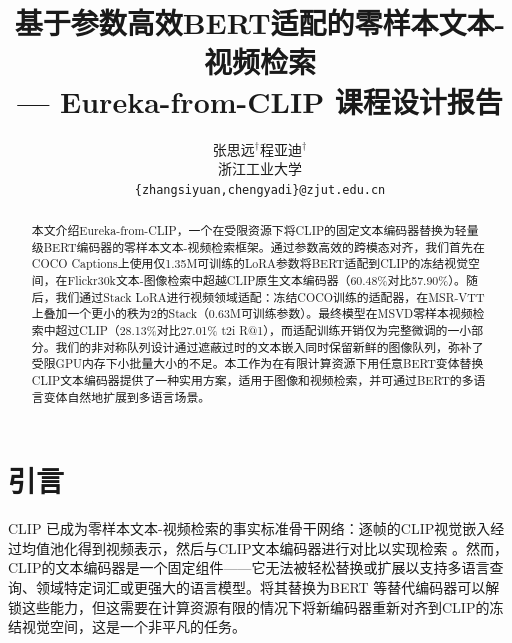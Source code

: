 \documentclass[10pt,a4paper]{ctexart}
\begin{document}
\title{基于参数高效BERT适配的零样本文本-视频检索 \\
\large --- Eureka-from-CLIP 课程设计报告}

\author{张思远$^{\dagger}$\quad 程亚迪$^{\dagger}$\\[4pt]
  \small 浙江工业大学\\
  \small\texttt{\{zhangsiyuan,chengyadi\}@zjut.edu.cn}}

\maketitle

\let\thefootnote\relax
{}

\begin{abstract}
本文介绍Eureka-from-CLIP，一个在受限资源下将CLIP的固定文本编码器替换为轻量级BERT编码器的零样本文本-视频检索框架。通过参数高效的跨模态对齐，我们首先在COCO Captions上使用仅1.35M可训练的LoRA参数将BERT适配到CLIP的冻结视觉空间，在Flickr30k文本-图像检索中超越CLIP原生文本编码器（60.48\%对比57.90\%）。随后，我们通过Stack LoRA进行视频领域适配：冻结COCO训练的适配器，在MSR-VTT上叠加一个更小的秩为2的Stack（0.63M可训练参数）。最终模型在MSVD零样本视频检索中超过CLIP（28.13\%对比27.01\% t2i R@1），而适配训练开销仅为完整微调的一小部分。我们的非对称队列设计通过遮蔽过时的文本嵌入同时保留新鲜的图像队列，弥补了受限GPU内存下小批量大小的不足。本工作为在有限计算资源下用任意BERT变体替换CLIP文本编码器提供了一种实用方案，适用于图像和视频检索，并可通过BERT的多语言变体自然地扩展到多语言场景。
\end{abstract}

\bigskip

\section{引言}

CLIP \citep{radford2021clip}已成为零样本文本-视频检索的事实标准骨干网络：逐帧的CLIP视觉嵌入经过均值池化得到视频表示，然后与CLIP文本编码器进行对比以实现检索 \citep{luo2022clip4clip}。然而，CLIP的文本编码器是一个固定组件——它无法被轻松替换或扩展以支持多语言查询、领域特定词汇或更强大的语言模型。将其替换为BERT \citep{devlin2019bert}等替代编码器可以解锁这些能力，但这需要在计算资源有限的情况下将新编码器重新对齐到CLIP的冻结视觉空间，这是一个非平凡的任务。
\end{document}
